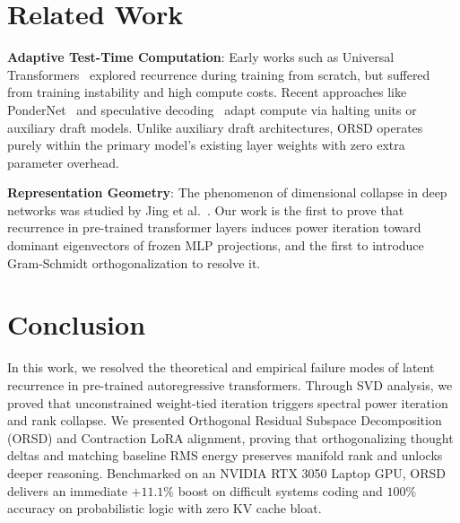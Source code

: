 \documentclass[11pt,a4paper]{article}
\theoremstyle{plain}
\theoremstyle{definition}
\theoremstyle{remark}
\begin{document}
\section{Related Work}
\textbf{Adaptive Test-Time Computation}: Early works such as Universal Transformers~\cite{dehghani2018universal} explored recurrence during training from scratch, but suffered from training instability and high compute costs. Recent approaches like PonderNet~\cite{banino2021pondernet} and speculative decoding~\cite{leviathan2023fast} adapt compute via halting units or auxiliary draft models. Unlike auxiliary draft architectures, ORSD operates purely within the primary model's existing layer weights with zero extra parameter overhead.

\textbf{Representation Geometry}: The phenomenon of dimensional collapse in deep networks was studied by Jing et al.~\cite{jing2021understanding}. Our work is the first to prove that recurrence in pre-trained transformer layers induces power iteration toward dominant eigenvectors of frozen MLP projections, and the first to introduce Gram-Schmidt orthogonalization to resolve it.

\section{Conclusion}
In this work, we resolved the theoretical and empirical failure modes of latent recurrence in pre-trained autoregressive transformers. Through SVD analysis, we proved that unconstrained weight-tied iteration triggers spectral power iteration and rank collapse. We presented Orthogonal Residual Subspace Decomposition (ORSD) and Contraction LoRA alignment, proving that orthogonalizing thought deltas and matching baseline RMS energy preserves manifold rank and unlocks deeper reasoning. Benchmarked on an NVIDIA RTX 3050 Laptop GPU, ORSD delivers an immediate $+11.1\%$ boost on difficult systems coding and $100\%$ accuracy on probabilistic logic with zero KV cache bloat.
\end{document}
